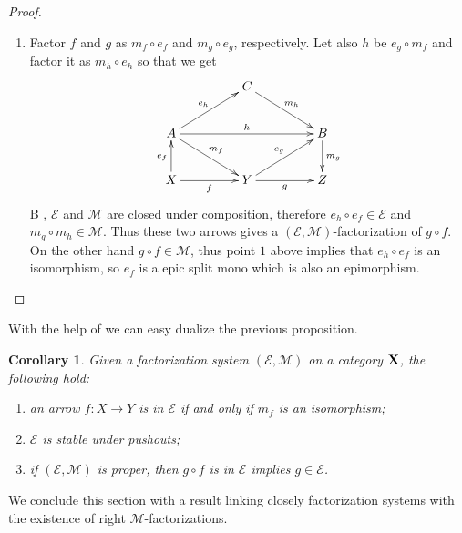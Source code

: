 \documentclass[a4paper]{article}
\def\X{\textbf {\textup{X}}}
\newtheorem{corollary}[theorem]{Corollary}
\theoremstyle{definition}
\begin{document}
\begin{proof}
\begin{enumerate}
		\item 
		Factor $f$ and $g$ as $m_f\circ e_f$ and $m_g\circ e_g$, respectively. Let also $h$ be $e_g\circ m_f$ and factor it as $m_h\circ e_h$ so that we get 
		\[\xymatrix@C=45pt{& C \ar[dr]^{m_h}&\\
			A\ar[ur]^{e_h} \ar[rr]^{h}  \ar[dr]^{m_f}& &B \ar[d]^{m_g}\\
			X \ar[u]^{e_f} \ar[r]_f& Y \ar[r]_g \ar[ur]^{e_g} & Z}\]
		B , $\mathcal{E}$ and $\mathcal{M}$ are closed under composition, therefore $e_h\circ e_f\in \mathcal{E}$ and $m_g \circ m_h\in \mathcal{M}$. Thus these two arrows gives a $(\mathcal{E}, \mathcal{M})$-factorization of $g\circ f$. On the other hand $g\circ f\in \mathcal{M}$, thus point $1$ above  implies that  $e_h\circ e_f$ is an isomorphism, so $e_f$ is a epic split mono which is also an epimorphism. \qedhere
	\end{enumerate}
\end{proof}

With the help of  we can easy dualize the previous proposition.
\begin{corollary}\label{cor:iso2}
	Given a factorization system $(\mathcal{E}, \mathcal{M})$ on a category $\X$, the following hold:
	\begin{enumerate}
		\item an arrow $f\colon X\to Y$ is in $\mathcal{E}$ if and only if $m_f$ is an isomorphism;
		\item $\mathcal{E}$ is stable under pushouts;
		\item  if $(\mathcal{E}, \mathcal{M})$ is proper, then $g\circ f$ is in $\mathcal{E}$ implies $g\in \mathcal{E}$.
	\end{enumerate}
\end{corollary}

We conclude this section with a result linking closely factorization systems with the existence of right $\mathcal{M}$-factorizations.
\end{document}
